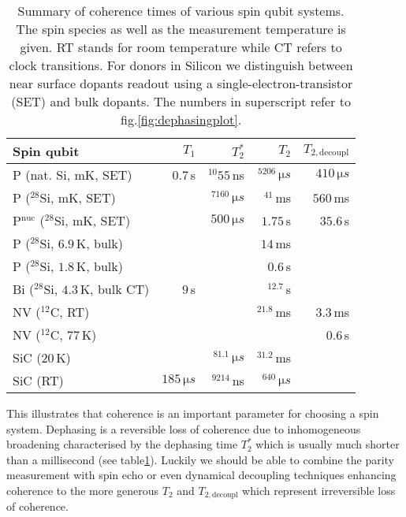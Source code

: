 \bgroup
\def\arraystretch{1.3}%
\begin{table}[H] 
	\footnotesize 
	\begin{tabular}{lrrrr}
		\hline
		Spin qubit & $T_1$ & $T_2^{*}$ & $T_2$ & $T_{2,\textrm{decoupl}}$ \\ \hline 
		P (nat. Si, mK, SET) \cite{Pla2012}& $0.7\, $s & $^{10}55\, $ns  & $^5206\, \si{\micro s}$ & $410\, \si{\micro s}$  \\
		P ($^{28}$Si, mK, SET) \cite{Muhonen2014}&  & $^7160\, \si{\micro s}$  & $^41\, $ms & $560\, $ms \\
		P$^{\text{nuc}}$ ($^{28}$Si, mK, SET) \cite{Muhonen2014}& & $500\, \si{\micro s}$ & $1.75\, $s & $35.6\, $s \\
		P ($^{28}$Si, $6.9\, $K, bulk) \cite{Morley2010}& &  & $14\, $ms &  \\
		P ($^{28}$Si, $1.8\, $K, bulk) \cite{Tyryshkin2011}& &  & $0.6\, $s &  \\
		Bi ($^{28}$Si, $4.3\, $K, bulk CT) \cite{Wolfowicz2013} & $9\, $s &  & $^12.7\, $s &\\
		NV ($^{12}$C, RT) \cite{Balasubramanian2009,Bar-Gill2013} & & & $^21.8\, $ms & $3.3\, $ms \\
		NV ($^{12}$C, $77\, $K) \cite{Bar-Gill2013} & & &  & $0.6\, $s \\
		SiC ($20\, $K) \cite{Christle2014} & & $^81.1\, \si{\micro s}$ & $^31.2\, $ms &  \\
		SiC (RT) \cite{Koehl2011} & $185\, \si{\micro s}$ & $^9214\, $ns & $^640\, \si{\micro s}$ &   \\
		\hline
	\end{tabular} 
	\caption{Summary of coherence times of various spin qubit systems. The spin species as well as the measurement temperature is given. RT stands for room temperature while CT refers to clock transitions. For donors in Silicon we distinguish between near surface dopants readout using a single-electron-transistor (SET) and bulk dopants. The numbers in superscript refer to fig.\@ \ref{fig:dephasingplot}.}
	\label{TAB:qubits}
\end{table}
\egroup




This illustrates that coherence is an important parameter for choosing a spin system. Dephasing is a reversible loss of coherence due to inhomogeneous broadening characterised by the dephasing time $T_2^*$ which is usually much shorter than a millisecond (see table\@ \ref{TAB:qubits}). Luckily we should be able to combine the parity measurement with spin echo or even dynamical decoupling techniques enhancing coherence to the more generous $T_2$ and $T_{2,\textrm{decoupl}}$ which represent irreversible loss of coherence.

